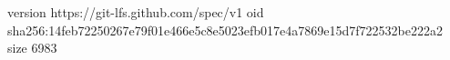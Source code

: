 version https://git-lfs.github.com/spec/v1
oid sha256:14feb72250267e79f01e466e5c8e5023efb017e4a7869e15d7f722532be222a2
size 6983
